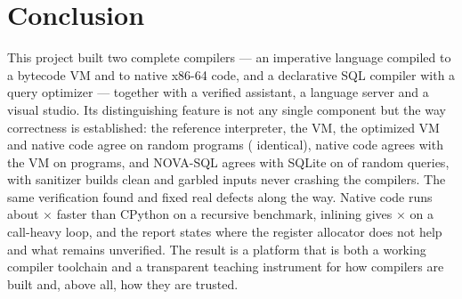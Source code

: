 \section{Conclusion}
This project built two complete compilers --- an imperative language compiled to a bytecode VM and to native x86-64 code, and a declarative SQL compiler with a query optimizer --- together with a verified assistant, a language server and a visual studio. Its distinguishing feature is not any single component but the way correctness is established: the reference interpreter, the VM, the optimized VM and native code agree on \FuzzN{} random programs (\FuzzPassed{} identical), native code agrees with the VM on \NativeDiffPass{} programs, and NOVA-SQL agrees with SQLite on \SQLFuzzPass{} of \SQLFuzzTotal{} random queries, with sanitizer builds clean and garbled inputs never crashing the compilers. The same verification found and fixed real defects along the way. Native code runs about \BenchFibVspy$\times$ faster than CPython on a recursive benchmark, inlining gives \BenchInlineGain$\times$ on a call-heavy loop, and the report states where the register allocator does not help and what remains unverified. The result is a platform that is both a working compiler toolchain and a transparent teaching instrument for how compilers are built and, above all, how they are trusted.
